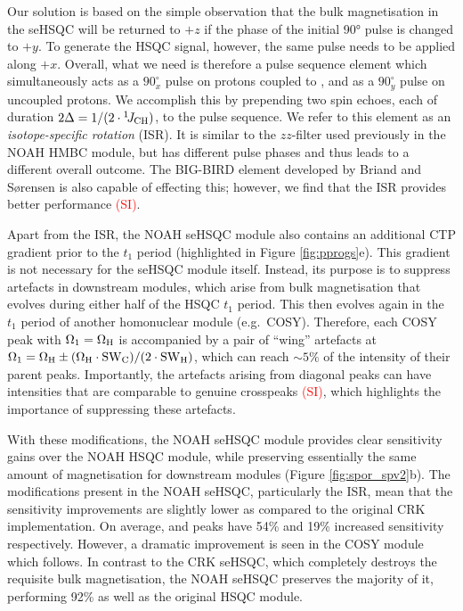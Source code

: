 \documentclass[11pt]{article}
\newcommand*{\carbon}{\ce{^{13}C}}
\newcommand*{\proton}{\ce{^{1}H}}
\newcommand*{\red}[1]{\textcolor{red}{#1}}
\newcommand*{\onejch}{{}^{1}\!J_{\ce{CH}}}
\newcommand*{\figref}[1]{Figure \ref{fig:#1}}
\newcommand*{\sitodo}{\red{(SI)}}
\begin{document}
Our solution is based on the simple observation that the bulk magnetisation in the seHSQC will be returned to $+z$ if the phase of the initial \proton{} \ang{90} pulse is changed to $+y$.
To generate the HSQC signal, however, the same pulse needs to be applied along $+x$.
Overall, what we need is therefore a pulse sequence element which simultaneously acts as a $90^\circ_x$ pulse on protons coupled to \carbon{}, and as a $90^\circ_y$ pulse on uncoupled protons.
We accomplish this by prepending two spin echoes, each of duration $2\Delta = 1/(2 \cdot \onejch)$, to the pulse sequence.
We refer to this element as an \textit{isotope-specific rotation} (ISR).
It is similar to the $zz$-filter used previously in the NOAH HMBC module,\autocite{Kupce2018CC, Kupce2019JMR} but has different pulse phases and thus leads to a different overall outcome.
The BIG-BIRD element developed by Briand and S{\o}rensen is also capable of effecting this;\autocite{Briand1997JMR} however, we find that the ISR provides better performance \sitodo{}.

Apart from the ISR, the NOAH seHSQC module also contains an additional CTP gradient prior to the $t_1$ period (highlighted in \figref{pprogs}e).
This gradient is not necessary for the seHSQC module itself.
Instead, its purpose is to suppress artefacts in downstream modules, which arise from bulk magnetisation that evolves during either half of the HSQC $t_1$ period.
This then evolves again in the $t_1$ period of another homonuclear module (e.g.\ COSY).
Therefore, each COSY peak with $\Omega_1 = \Omega_{\ce{H}}$ is accompanied by a pair of ``wing'' artefacts at $\Omega_1 = \Omega_{\ce{H}} \pm (\Omega_{\ce{H}}\cdot\mathrm{SW}_{\ce{C}})/(2\cdot \mathrm{SW}_{\ce{H}})$, which can reach $\sim 5\%$ of the intensity of their parent peaks.
Importantly, the artefacts arising from diagonal peaks can have intensities that are comparable to genuine crosspeaks \sitodo{}, which highlights the importance of suppressing these artefacts.

With these modifications, the NOAH seHSQC module provides clear sensitivity gains over the NOAH HSQC module, while preserving essentially the same amount of magnetisation for downstream modules (\figref{spor_spv2}b).
The modifications present in the NOAH seHSQC, particularly the ISR, mean that the sensitivity improvements are slightly lower as compared to the original CRK implementation.
On average,  and  peaks have 54\% and 19\% increased sensitivity respectively.
However, a dramatic improvement is seen in the COSY module which follows.
In contrast to the CRK seHSQC, which completely destroys the requisite bulk magnetisation, the NOAH seHSQC preserves the majority of it, performing 92\% as well as the original HSQC module.
\end{document}
